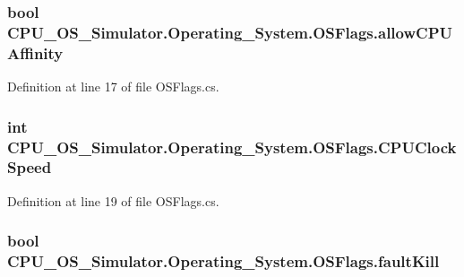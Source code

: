 \subsubsection[{allow\+C\+P\+U\+Affinity}]{\setlength{\rightskip}{0pt plus 5cm}bool C\+P\+U\+\_\+\+O\+S\+\_\+\+Simulator.\+Operating\+\_\+\+System.\+O\+S\+Flags.\+allow\+C\+P\+U\+Affinity}\label{struct_c_p_u___o_s___simulator_1_1_operating___system_1_1_o_s_flags_ac1d1812ad9ef56ccadacb19831d2e92d}


Definition at line 17 of file O\+S\+Flags.\+cs.

\hypertarget{struct_c_p_u___o_s___simulator_1_1_operating___system_1_1_o_s_flags_a51541aa57e2e3114e111faff27a5d4cd}{}
\subsubsection[{C\+P\+U\+Clock\+Speed}]{\setlength{\rightskip}{0pt plus 5cm}int C\+P\+U\+\_\+\+O\+S\+\_\+\+Simulator.\+Operating\+\_\+\+System.\+O\+S\+Flags.\+C\+P\+U\+Clock\+Speed}\label{struct_c_p_u___o_s___simulator_1_1_operating___system_1_1_o_s_flags_a51541aa57e2e3114e111faff27a5d4cd}


Definition at line 19 of file O\+S\+Flags.\+cs.

\hypertarget{struct_c_p_u___o_s___simulator_1_1_operating___system_1_1_o_s_flags_ab6e0543edd30b393255293bccf19c9d1}{}
\subsubsection[{fault\+Kill}]{\setlength{\rightskip}{0pt plus 5cm}bool C\+P\+U\+\_\+\+O\+S\+\_\+\+Simulator.\+Operating\+\_\+\+System.\+O\+S\+Flags.\+fault\+Kill}\label{struct_c_p_u___o_s___simulator_1_1_operating___system_1_1_o_s_flags_ab6e0543edd30b393255293bccf19c9d1}


